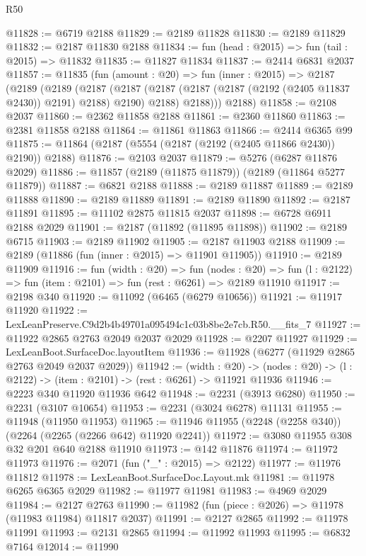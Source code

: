 \begin{lexlean}{R50}
\begin{coremodule}
@11828 := @6719 @2188
@11829 := @2189 @11828
@11830 := @2189 @11829
@11832 := @2187 @11830 @2188
@11834 := fun (head : @2015) => fun (tail : @2015) => @11832
@11835 := @11827 @11834
@11837 := @2414 @6831 @2037
@11857 := @11835
    (fun (amount : @20) =>
    fun (inner : @2015) =>
    @2187
      (@2189
        (@2189
          (@2187
            (@2187 (@2187 (@2187 (@2187 (@2192 (@2405 @11837 @2430)) @2191) @2188) @2190) @2188)
            @2188)))
      @2188)
@11858 := @2108 @2037
@11860 := @2362 @11858 @2188
@11861 := @2360 @11860
@11863 := @2381 @11858 @2188
@11864 := @11861 @11863
@11866 := @2414 @6365 @99
@11875 := @11864 (@2187 (@5554 (@2187 (@2192 (@2405 @11866 @2430)) @2190)) @2188)
@11876 := @2103 @2037
@11879 := @5276 (@6287 @11876 @2029)
@11886 := @11857 (@2189 (@11875 @11879)) (@2189 (@11864 @5277 @11879))
@11887 := @6821 @2188
@11888 := @2189 @11887
@11889 := @2189 @11888
@11890 := @2189 @11889
@11891 := @2189 @11890
@11892 := @2187 @11891
@11895 := @11102 @2875 @11815 @2037
@11898 := @6728 @6911 @2188 @2029
@11901 := @2187 (@11892 (@11895 @11898))
@11902 := @2189 @6715
@11903 := @2189 @11902
@11905 := @2187 @11903 @2188
@11909 := @2189 (@11886 (fun (inner : @2015) => @11901 @11905))
@11910 := @2189 @11909
@11916 := fun (width : @20) =>
  fun (nodes : @20) => fun (l : @2122) => fun (item : @2101) => fun (rest : @6261) => @2189 @11910
@11917 := @2198 @340
@11920 := @11092 (@6465 (@6279 @10656))
@11921 := @11917 @11920
@11922 := LexLeanPreserve.C9d2b4b49701a095494c1c03b8be2e7cb.R50.__fits_7
@11927 := @11922 @2865 @2763 @2049 @2037 @2029
@11928 := @2207 @11927
@11929 := LexLeanBoot.SurfaceDoc.layoutItem
@11936 := @11928 (@6277 (@11929 @2865 @2763 @2049 @2037 @2029))
@11942 := (width : @20) ->
  (nodes : @20) -> (l : @2122) -> (item : @2101) -> (rest : @6261) -> @11921 @11936
@11946 := @2223 @340 @11920 @11936 @642
@11948 := @2231 (@3913 @6280)
@11950 := @2231 (@3107 @10654)
@11953 := @2231 (@3024 @6278) @11131
@11955 := @11948 (@11950 @11953)
@11965 := @11946 @11955 (@2248 (@2258 @340)) (@2264 (@2265 (@2266 @642) @11920 @2241))
@11972 := @3080 @11955 @308 @32 @201 @640 @2188 @11910
@11973 := @142 @11876
@11974 := @11972 @11973
@11976 := @2071 (fun ("_" : @2015) => @2122)
@11977 := @11976 @11812
@11978 := LexLeanBoot.SurfaceDoc.Layout.mk
@11981 := @11978 @6265 @6365 @2029
@11982 := @11977 @11981
@11983 := @4969 @2029
@11984 := @2127 @2763
@11990 := @11982 (fun (piece : @2026) => @11978 (@11983 @11984) @11817 @2037)
@11991 := @2127 @2865
@11992 := @11978 @11991
@11993 := @2131 @2865
@11994 := @11992 @11993
@11995 := @6832 @7164
@12014 := @11990

\end{coremodule}
\end{lexlean}
